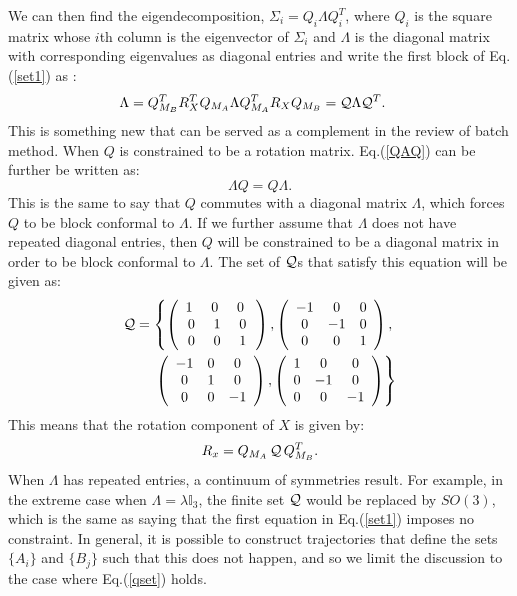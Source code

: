 \documentclass[twocolumn,10pt]{asme2ej}
\begin{document}
We can then find the eigendecomposition, $ \Sigma_{i}=Q_i \Lambda Q_i^T$, where $Q_i$ is the square matrix whose $i$th column is the eigenvector of $\Sigma_i$ and $\Lambda$ is the diagonal matrix with corresponding eigenvalues as diagonal entries and write the first block of Eq.(\ref{set1}) as \cite{ackermanGSI, ackermanIROS2013}:
\begin{align}
\Lambda &= Q_{M_B}^T R_X^T Q_{M_A} \Lambda Q_{M_A}^T R_X Q_{M_B} = {\cal Q} \Lambda {\cal Q}^T.
\label{QAQ}
\end{align}
{\color{red} {\color{blue}This is something new that can be served as a complement in the review of batch method.}
When $Q$ is constrained to be a rotation matrix. Eq.(\ref{QAQ}) can be further be written as:
\begin{equation}
\Lambda Q = Q \Lambda.
\end{equation}
This is the same to say that $Q$ commutes with a diagonal matrix $\Lambda$, which forces $Q$ to be block conformal to $\Lambda$. If we further assume that $\Lambda$ does not have repeated diagonal entries, then $Q$ will be constrained to be a diagonal matrix in order to be block conformal to $\Lambda$.} The set of ${\cal Q}$s that satisfy this equation will be given as:
\begin{equation}
\begin{split}
{\cal Q} = \left\{ \left(\begin{array}{ccc}
1\,\, & 0 \,\, & 0 \,\, \\
0 & 1 & 0\\
0 & 0 & 1 \end{array}\right) , \left(\begin{array}{ccc}
-1 & 0 & 0 \\
0 & -1 & 0\\
0 & 0 & 1 \end{array}\right), \right.\\
\left. \left(\begin{array}{ccc}
-1 & 0 & 0 \\
0 & 1 & 0\\
0 & 0 & -1 \end{array}\right), \left(\begin{array}{ccc}
1 & 0 & 0 \\
0 & -1 & 0\\
0 & 0 & -1 \end{array}\right)\right\}
\end{split} 
\label{qset}
\end{equation}
This means that the rotation component of $X$ is given by:
\begin{equation}
R_x=Q_{M_A}\,{\cal Q}\,Q_{M_B}^T.
\label{RQ}\end{equation}
When $\Lambda$ has repeated entries, a continuum of symmetries result. For example, in the extreme case when $\Lambda = \lambda \mathbb{I}_3$, the
finite set ${\cal Q}$ would be replaced by $SO(3)$, which is the same as saying that the first equation in Eq.(\ref{set1}) imposes no constraint. In general, it is possible to construct trajectories that define the sets $\{A_i\}$ and $\{B_j\}$ such that this does not happen, and so we limit the discussion to the case where Eq.(\ref{qset}) holds.
\end{document}
